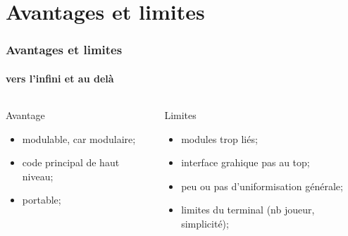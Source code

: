 \documentclass{beamer}
\begin{document}
    \section{Avantages et limites}
    \begin{frame}
    \frametitle{Avantages et limites}
    \framesubtitle{vers l'infini et au delà}
        \begin{columns}[c] %
            \begin{column}{5.5cm} %
                \begin{exampleblock}{Avantage}
                    \begin{itemize}
                        \item modulable, car modulaire;
                        \item code principal de haut niveau;
                        \item portable;
                    \end{itemize}
                \end{exampleblock}
            \end{column}
            \begin{column}{5.5cm} %
                \begin{alertblock}{Limites}
                    \begin{itemize}
                        \item modules trop liés;
                        \item interface grahique pas au top; 
                        \item peu ou pas d'uniformisation générale;
                        \item limites du terminal (nb joueur, simplicité);
                    \end{itemize}
                \end{alertblock}
            \end{column}
        \end{columns}
    \end{frame}




\end{document}
